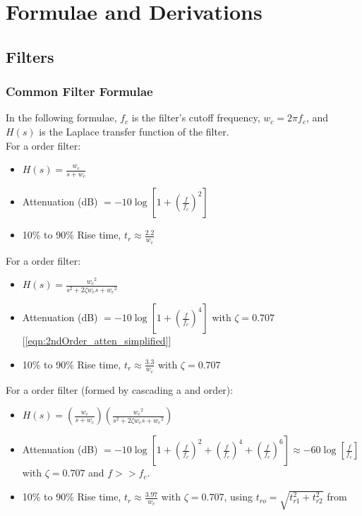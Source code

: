 \graphicspath{{endmatter/figures/}}
\chapter{Formulae and Derivations}
\makeatletter{}\makeatother

\section{Filters}

\subsection{Common Filter Formulae}{\label{filter_formulae}}
In the following formulae, $f_c$ is the filter's cutoff frequency, $w_c = 2 \pi f_c$, and $H(s)$ is the
Laplace transfer function of the filter. \\

\noindent For a  order filter:
\begin{itemize}
\item $H(s) = \frac{w_c}{s + w_c}$
\item Attenuation (dB) $ = -10\log[1 + (\frac{f}{f_{c}})^{2}]$ \cite{pwmAnalogConversion}
\item 10\% to 90\% Rise time, $t_r \approx \frac{2.2}{w_c}$ \cite{firstOrderRiseTime}
\end{itemize}

\noindent For a  order filter:
\begin{itemize}
    \item $H(s) = \frac{{w_c}^2}{s^2 + 2 \zeta w_c s + {w_c}^2}$
    \item Attenuation (dB) $ = -10\log [1+(\frac{f}{f_c})^4]$ with $\zeta = 0.707$ [\ref{eqn:2ndOrder_atten_simplified}]
    \item 10\% to 90\% Rise time, $t_r \approx \frac{3.3}{w_c}$ with $\zeta = 0.707$ \cite{gopal2003digital}
\end{itemize}

\noindent For a  order filter (formed by cascading a  and  order):
\begin{itemize}
    \item $H(s) = \left( \frac{w_c}{s + w_c} \right) \left( \frac{{w_c}^2}{s^2 + 2 \zeta w_c s + {w_c}^2} \right)$
    \item Attenuation (dB) $ = -10\log [1+(\frac{f}{f_c})^2+(\frac{f}{f_c})^4+(\frac{f}{f_c})^6] \approx -60\log \left[\frac{f}{f_c}\right]$ with $\zeta = 0.707$ and $f >> f_c$.
    \item 10\% to 90\% Rise time, $t_r \approx \frac{3.97}{w_c}$ with $\zeta = 0.707$, using $t_{ro} = \sqrt{t_{r1}^2 + t_{r2}^2}$ from \cite{cascadedRiseTime}
\end{itemize}

